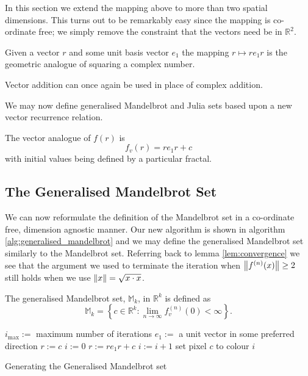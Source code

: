 In this section we extend the mapping above to more than two spatial dimensions.
This turns out to be remarkably easy since the mapping is co-ordinate free;
we simply remove the constraint that the vectors need be in $\mathbb{R}^2$.

\begin{definition}
Given a vector $r$ and some unit basis vector $e_1$ the mapping
$r \mapsto re_1r$ is the geometric analogue of squaring a complex number.
\end{definition}

Vector addition can once again be used in place of complex addition.


We may now define generalised Mandelbrot and Julia sets based upon
a new vector recurrence relation.

\begin{definition}\label{def:gen_f(r)}
The vector analogue of $f(r)$ is 
\[
f_v(r) = re_1r + c
\]
with initial values being defined by a particular fractal.
\end{definition}

\subsection{The Generalised Mandelbrot Set}

We can now reformulate the definition of the Mandelbrot set in a co-ordinate
free, dimension agnostic manner. Our new algorithm is shown in algorithm
\ref{alg:generalised_mandelbrot} and we may define the generalised
Mandelbrot set similarly to the Mandelbrot set. Referring back to lemma
\ref{lem:convergence} we see that the argument we used to terminate the iteration
when $\left\Vert f^{(n)}(x) \right\Vert \ge 2$ still holds when we use $\left\Vert x \right\Vert = \sqrt{x \cdot x}$.

\begin{definition}
The generalised Mandelbrot set, $\mathbb{M}_k$, in $\mathbb{R}^k$ 
    is defined as
\[
\mathbb{M}_k = 
\left\{c \in \mathbb{R}^k 
: \lim_{n \rightarrow \infty} f_v^{(n)}(0) < \infty \right\}.
\]
\end{definition}

\begin{fancyalg}
\begin{algorithmic}[1]
\STATE $i_{\mathrm{max}} :=$ maximum number of iterations
\STATE $e_1 :=$ a unit vector in some preferred direction
\STATE $r := c$
\STATE $i := 0$
  \STATE $r := re_1r + c$
  \STATE $i := i+1$
\ENDWHILE 
\STATE set pixel $c$ to colour $i$
\ENDFOR
\end{algorithmic}
\caption{
\label{alg:generalised_mandelbrot}
  Generating the Generalised Mandelbrot set}
\end{fancyalg}

